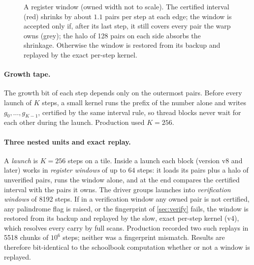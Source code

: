 \documentclass[11pt,a4paper]{article}
\theoremstyle{remark}
\begin{document}
\begin{figure}[t]
\centering
{}
\caption{A register window (owned width not to scale). The certified interval (red) shrinks by about $1.1$ pairs per step at each edge; the window is accepted only if, after its last step, it still covers every pair the warp owns (grey); the halo of 128 pairs on each side absorbs the shrinkage. Otherwise the window is restored from its backup and replayed by the exact per-step kernel.}
\label{fig:interval}
\end{figure}

\paragraph{Growth tape.}
The growth bit of each step depends only on the outermost pairs. Before every launch of $K$ steps, a small kernel runs the prefix of the number alone and writes $g_0,\dots,g_{K-1}$, certified by the same interval rule, so thread blocks never wait for each other during the launch. Production used $K=256$.

\paragraph{Three nested units and exact replay.}
A \emph{launch} is $K=256$ steps on a tile. Inside a launch each block (version v8 and later) works in \emph{register windows} of up to $64$ steps: it loads its pairs plus a halo of unverified pairs, runs the window alone, and at the end compares the certified interval with the pairs it owns. The driver groups launches into \emph{verification windows} of \num{8192} steps. If in a verification window any owned pair is not certified, any palindrome flag is raised, or the fingerprint of \cref{sec:verify} fails, the window is restored from its backup and replayed by the slow, exact per-step kernel (v4), which resolves every carry by full scans. Production recorded two such replays in \num{5518} chunks of $10^6$ steps; neither was a fingerprint mismatch. Results are therefore bit-identical to the schoolbook computation whether or not a window is replayed.
\end{document}
